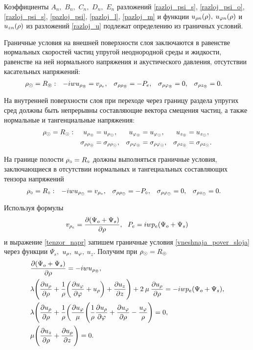 Коэффициенты $A_n,$ $B_n,$ $C_n,$ $D_n,$ $E_n$ разложений \eqref{razloj_psi_s}, \eqref{razloj_psi_o}, \eqref{razloj_psi_s}, \eqref{pazloj_psi}, \eqref{pazloj_l}, \eqref{pazloj_m} и функции $u_{\rho n}(\rho),$ $u_{\varphi n}(\rho)$ и $u_{z n}(\rho)$ из разложений \eqref{razloj_u} подлежат определению из граничных условий.

Граничные условия на внешней поверхности слоя заключаются в равенстве нормальных скоростей частиц упругой неоднородной среды и жидкости, равенстве на ней нормального напряжения и акустического давления, отсутствии касательных напряжений:
\begin{equation}\label{vneshnaja_pover_sloja}
\begin{aligned}
\rho_\odot &=R_\circledcirc: &-iwu_{\rho_\circledcirc}&=v_{\rho_e}, &\sigma_{\rho\rho_\circledcirc}&=-P_e, &\sigma_{\rho\varphi_\circledcirc}&=0, &\sigma_{\rho z_\circledcirc}&=0.
\end{aligned}
\end{equation}

На внутренней поверхности слоя при переходе через границу раздела упругих сред должны быть непрерывны составляющие вектора смещения частиц, а также нормальные и тангенциальные напряжения:
\begin{equation}\label{vnutr_pover_sloja}
\begin{aligned}
\rho_\odot&=R_\odot: &u_{\rho_\circledcirc}&=u_{\rho_\odot}, &u_{\varphi_\circledcirc}&=u_{\varphi_\odot}, &u_{z_\circledcirc}&=u_{z_\odot},\\
& &\sigma_{\rho\rho_\circledcirc}&=\sigma_{\rho\rho_\odot}, &\sigma_{\rho\varphi_\circledcirc}&=\sigma_{\rho\varphi_\odot},  &\sigma_{\rho z_\circledcirc}&=\sigma_{\rho z_\odot}.
\end{aligned}
\end{equation}

На границе полости $\rho_\circ=R_\circ$ должны выполняться граничные условия, заключающиеся в отсутствии нормальных и тангециальных составляющих тензора напряжений
\begin{equation}\label{gran_pol}
\begin{aligned}
\rho_\circ &=R_\circ: &-iwu_{\rho_\odot}&=v_{\rho_\circ}, &\sigma_{\rho\rho_\odot}&=-P_\circ, &\sigma_{\rho\varphi_\odot}&=0, &\sigma_{\rho z_\odot}&=0.
\end{aligned}
\end{equation}

Используя формулы
$$v_{\rho_e}=\frac{\partial(\Psi_{o}+\Psi_s)}{\partial\rho},\:\:\: P_e=iwp_e(\Psi_{o}+\Psi_s)$$
и выражение \eqref{tenzor_napr} запишем граничные условия \eqref{vneshnaja_pover_sloja} через функции $\Psi_s,$ $u_\rho,$ $u_\varphi,$ $u_z$. Получим при $\rho_\odot=R_\circledcirc$
\begin{align}
&\frac{\partial(\Psi_{o}+\Psi_s)}{\partial\rho}=-iwu_{\rho_\circledcirc},\\
&\lambda\Biggl(\frac{\partial u_{\rho}}{\partial \rho}+\frac{1}{\rho}\biggl(\frac{\partial u_\varphi}{\partial\varphi}+u_{\rho}\biggr)+\frac{\partial u_z}{\partial z}\Biggr)+2\:\mu\:\frac{\partial u_{\rho}}{\partial \rho}=-iwp_e(\Psi_{o}+\Psi_s),\\
&\lambda\Biggl(\frac{\partial u_{\rho}}{\partial \rho}+\frac{1}{\rho}\biggl(\frac{\partial u_\varphi}\mu\Biggl(\frac{1}{\rho}\frac{\partial u_{\rho}}{\partial\varphi}+\frac{\partial u_\varphi}{\partial \rho}-\frac{u_{\varphi}}{\rho}\Biggr)=0,\\
&\mu\Biggl(\frac{\partial u_z}{\partial \rho}+\frac{\partial u_{\rho}}{\partial z}\Biggr)=0.
\end{align}

